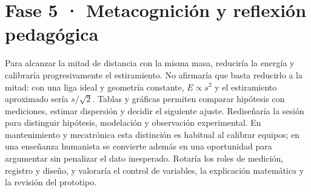 \documentclass[spanish,letterpaper,oneside]{article}
\begin{document}
\section{Fase 5 · Metacognición y reflexión pedagógica}
Para alcanzar la mitad de distancia con la misma masa, reduciría la energía y calibraría progresivamente el estiramiento. No afirmaría que basta reducirlo a la mitad: con una liga ideal y geometría constante, $E\propto s^2$ y el estiramiento aproximado sería $s/\sqrt2$. Tablas y gráficas permiten comparar hipótesis con mediciones, estimar dispersión y decidir el siguiente ajuste.
Rediseñaría la sesión para distinguir hipótesis, modelación y observación experimental. En mantenimiento y mecatrónica esta distinción es habitual al calibrar equipos; en una enseñanza humanista se convierte además en una oportunidad para argumentar sin penalizar el dato inesperado. Rotaría los roles de medición, registro y diseño, y valoraría el control de variables, la explicación matemática y la revisión del prototipo.
\end{document}
